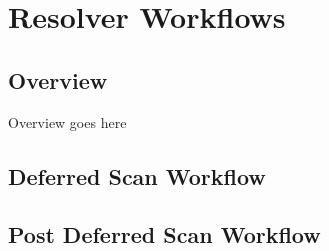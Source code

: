 \chapter{Resolver Workflows}\label{sec:resolver-workflows}

\section{Overview}
Overview goes here


\section{Deferred Scan Workflow}

\section{Post Deferred Scan Workflow}

